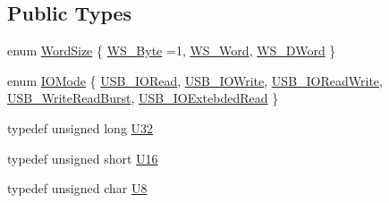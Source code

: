 \subsection*{Public Types}
\begin{DoxyCompactItemize}
\item 
enum \hyperlink{classUsbFTMLInterface_ae0f25daa336091a5acd548aef3e9b4b4}{Word\+Size} \{ \hyperlink{classUsbFTMLInterface_ae0f25daa336091a5acd548aef3e9b4b4a6d1f2c03dd60649290649efd7fb7f57d}{W\+S\+\_\+\+Byte} =1, 
\hyperlink{classUsbFTMLInterface_ae0f25daa336091a5acd548aef3e9b4b4adcfe42e171e84db403d40614f2502f3e}{W\+S\+\_\+\+Word}, 
\hyperlink{classUsbFTMLInterface_ae0f25daa336091a5acd548aef3e9b4b4abff203c40a75d695acbf9190ae2dbe69}{W\+S\+\_\+\+D\+Word}
 \}
\item 
enum \hyperlink{classUsbFTMLInterface_a181227ebb27454964e5b6d185432498d}{I\+O\+Mode} \{ \newline
\hyperlink{classUsbFTMLInterface_a181227ebb27454964e5b6d185432498da71463bc1f4116a7456f7f298d030ecc7}{U\+S\+B\+\_\+\+I\+O\+Read}, 
\hyperlink{classUsbFTMLInterface_a181227ebb27454964e5b6d185432498daa9295e3a8e1c21709afd36f4405b346b}{U\+S\+B\+\_\+\+I\+O\+Write}, 
\hyperlink{classUsbFTMLInterface_a181227ebb27454964e5b6d185432498dae7dbd66b9634d787979e1b081defc297}{U\+S\+B\+\_\+\+I\+O\+Read\+Write}, 
\hyperlink{classUsbFTMLInterface_a181227ebb27454964e5b6d185432498da9c6732d74013c323f7d0346793ea105c}{U\+S\+B\+\_\+\+Write\+Read\+Burst}, 
\newline
\hyperlink{classUsbFTMLInterface_a181227ebb27454964e5b6d185432498dab677684fb0f754cbca04824b202d8ebe}{U\+S\+B\+\_\+\+I\+O\+Extebded\+Read}
 \}
\item 
typedef unsigned long \hyperlink{classUsbFTMLInterface_a142f8ce4b5873c295af8945f3894ae38}{U32}
\item 
typedef unsigned short \hyperlink{classUsbFTMLInterface_a5909beb462dc45c772d6f7ae79312ad7}{U16}
\item 
typedef unsigned char \hyperlink{classUsbFTMLInterface_af7c9f02ee6f59fefa68ef14f90dcbbd8}{U8}
\end{DoxyCompactItemize}
